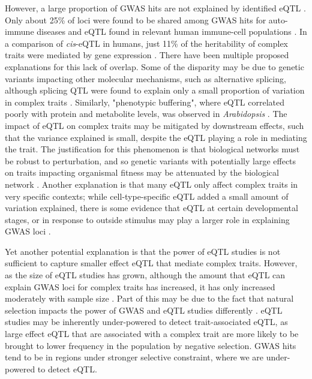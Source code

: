 \documentclass[article,9pt,twocolumn,twoside]{rilabRxiv}
\begin{document}
\par
However, a large proportion of GWAS hits are not explained by identified eQTL \citep{Chun,Umans,Connally}.
Only about 25\% of loci were found to be shared among GWAS hits for auto-immune diseases and eQTL found in relevant human immune-cell populations \citep{Chun}.
In a comparison of \textit{cis}-eQTL in humans, just 11\% of the heritability of complex traits were mediated by gene expression \citep{Yao}.
There have been multiple proposed explanations for this lack of overlap.
Some of the disparity may be due to genetic variants impacting other molecular mechanisms, such as alternative splicing, although splicing QTL were found to explain only a small proportion of variation in complex traits \citep{Mu}.
Similarly, "phenotypic buffering", where eQTL correlated poorly with protein and  metabolite levels, was observed in \textit{Arabidopsis} \citep{Fu}.
The impact of eQTL on complex traits may be mitigated by downstream effects, such that the variance explained is small, despite the eQTL playing a role in mediating the trait. 
The justification for this phenomenon is that  biological networks must be robust to perturbation, and so genetic variants with potentially large effects on traits impacting organismal fitness may be attenuated by the biological network \citep{Hu2}.
Another explanation is that many eQTL only affect complex traits in very specific contexts; while cell-type-specific eQTL added a small amount of variation explained, there is some evidence that eQTL at certain developmental stages, or in response to outside stimulus may play a larger role in explaining GWAS loci \citep{Mu,Snoek}.
\par
Yet another potential explanation is that the power of eQTL studies is not sufficient to capture smaller effect eQTL that mediate complex traits.
However, as the size of eQTL studies has grown, although the amount that eQTL can explain GWAS loci for complex traits has increased, it has only increased moderately with sample size \citep{Umans}.
Part of this may be due to the fact that natural selection impacts the power of GWAS and eQTL studies differently \citep{Mostafavi}.
eQTL studies may be inherently under-powered to detect trait-associated eQTL, as large effect eQTL that are associated with a complex trait are more likely to be brought to lower frequency in the population by negative selection.
GWAS hits tend to be in regions under stronger selective constraint, where we are under-powered to detect eQTL.
\end{document}
